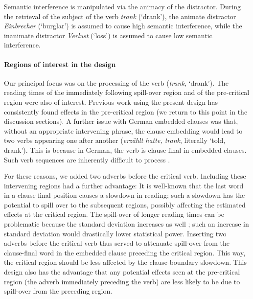 \documentclass[a4paper, man, floatsintext]{apa7}
\begin{document}
Semantic interference is manipulated via the animacy of the distractor. During the retrieval of the subject of the verb \textit{trank} (`drank'), the animate distractor  \textit{Einbrecher} (`burglar') is assumed to cause high semantic interference, while the inanimate distractor \textit{Verlust} (`loss') is assumed to cause low semantic interference. 

\paragraph{Regions of interest in the design}

Our principal focus was on the processing of the verb (\textit{trank}, `drank'). The reading times of the immediately following spill-over region and of the pre-critical region were also of interest. Previous work using the present design \parencite{vandyke07,mertzen} has consistently found effects in the pre-critical region (we return to this point in the discussion sections). A further issue with German embedded clauses \parencite[also see][]{mertzen} was that, without an appropriate intervening phrase, the clause embedding would lead to two verbs appearing one after another (\textit{erzählt hatte, trank}, literally `told, drank'). This is because in German, the verb is clause-final in embedded clauses. Such verb sequences are inherently difficult to process \parencite{VSLK11,bach1986crossed}. 

For these reasons, we added two adverbs before the critical verb. Including these intervening regions had a further advantage: 
It is well-known \parencite[e.g., ][]{rayner2000effect} that the last word in a clause-final position causes a slowdown in reading; such a slowdown has the potential to spill over to the subsequent regions, possibly affecting the estimated effects at the critical region. The spill-over of longer reading times can be problematic because the standard deviation increases as well \parencite{wagenmakers2007linear}; such an increase in standard deviation would drastically lower statistical power. 
Inserting two adverbs before the critical verb thus served to attenuate spill-over from the clause-final word in the embedded clause preceding the critical region. This way, the critical region should be less affected by the clause-boundary slowdown. This design also has the advantage that any potential effects seen at the pre-critical region (the adverb immediately preceding the verb) are less likely to be due to spill-over from the preceding region. 
\end{document}
